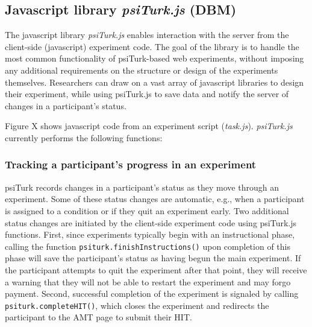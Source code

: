 \documentclass[twocolumn]{svjour3}          %
\begin{document}
%
%
%
%
%



\subsection{Javascript library \emph{psiTurk.js} (DBM)}

The javascript library \emph{psiTurk.js} enables interaction with the server from the client-side (javascript) experiment code.
The goal of the library is to handle the most common functionality of psiTurk-based web experiments, without imposing any additional requirements on the structure or design of the experiments themselves.
Researchers can draw on a vast array of javascript libraries to design their experiment, while using psiTurk.js to save data and notify the server of changes in a participant's status.

Figure X shows javascript code from an experiment script (\emph{task.js}). 
\emph{psiTurk.js} currently performs the following functions:


\subsubsection{Tracking a participant's progress in an experiment} 

psiTurk records changes in a participant's status as they move through an experiment. 
Some of these status changes are automatic, e.g., when a participant is assigned to a condition or if they quit an experiment early. 
Two additional status changes are initiated by the client-side experiment code using psiTurk.js functions.
First, since experiments typically begin with an instructional phase, calling the function \texttt{psiturk.finishInstructions()} upon completion of this phase will save the participant's status as having begun the main experiment.
If the participant attempts to quit the experiment after that point, they will receive a warning that they will not be able to restart the experiment and may forgo payment.
Second, successful completion of the experiment is signaled by calling \texttt{psiturk.completeHIT()}, which closes the experiment and redirects the participant to the AMT page to submit their HIT.
\end{document}
